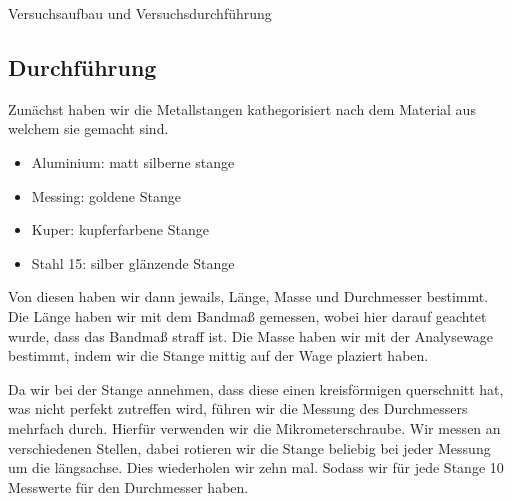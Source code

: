 \documentclass[twoside]{protokoll}
\begin{document}
\begin{aufgabe}{Versuchsaufbau und Versuchsdurchführung}
\subsection{Durchführung}

Zunächst haben wir die Metallstangen kathegorisiert nach dem Material aus welchem sie gemacht sind.

\begin{itemize}
\item Aluminium:		 matt silberne stange 
\item Messing:		 goldene Stange
\item Kuper:			 kupferfarbene Stange
\item Stahl 15:		 silber glänzende Stange
\end{itemize}

Von diesen haben wir dann jewails, Länge, Masse und Durchmesser bestimmt. 
Die Länge haben wir mit dem Bandmaß gemessen, wobei hier darauf geachtet wurde, dass das Bandmaß straff ist. Die Masse haben wir mit der Analysewage bestimmt, indem wir die Stange mittig auf der Wage plaziert haben. 


Da wir bei der Stange annehmen, dass diese einen kreisförmigen querschnitt hat, was nicht perfekt zutreffen wird, führen wir die Messung des Durchmessers mehrfach durch. Hierfür verwenden wir die Mikrometerschraube. Wir messen an verschiedenen Stellen, dabei rotieren wir die Stange beliebig bei jeder Messung um die längsachse. Dies wiederholen wir zehn mal. Sodass wir für jede Stange 10 Messwerte für den Durchmesser haben.\\ 


\end{aufgabe}
\end{document}
